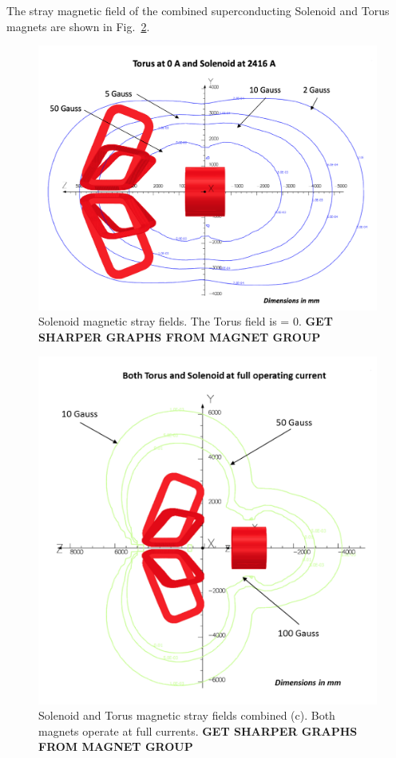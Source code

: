 \documentclass[final,3p,times,twocolumn,authoryear]{elsarticle}
\begin{document}
The stray magnetic field of the combined superconducting Solenoid and Torus magnets are shown in Fig.~\ref{stray-field}. 
\begin{figure}[htbp!]
\centerline{\includegraphics[width=1.0\columnwidth]{mag-field-1.png}}
\caption{Solenoid magnetic stray fields. The Torus field is = 0. {\bf GET SHARPER GRAPHS FROM MAGNET GROUP}  }
\label{stray-field}
\end{figure}

\begin{figure}[htbp!]
\centerline{\includegraphics[width=1.2\columnwidth]{mag-field-2.png}}
\caption{Solenoid and Torus magnetic stray fields combined (c). Both magnets operate at full currents.  {\bf GET SHARPER GRAPHS FROM MAGNET GROUP}  }
\label{stray-field}
\end{figure}
\end{document}
